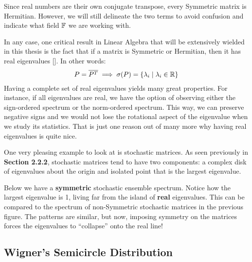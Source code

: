 \begin{remark}
Since real numbers are their own conjugate transpose, every Symmetric matrix is Hermitian. However, we will still delineate the two terms to avoid confusion and indicate what field $\mathbb{F}$ we are working with.
\end{remark}

In any case, one critical result in Linear Algebra that will be extensively wielded in this thesis is the fact that if a matrix is Symmetric or Hermitian, then it has real eigenvalues [\cite{horn}]. In other words:
\begin{align*}
P = \overline{P^{T}} \implies \sigma(P) = \{\lambda_i \mid \lambda_i \in \mathbb{R}\}
\end{align*}
Having a complete set of real eigenvalues yields many great properties. For instance, if all eigenvalues are real, we have the option of observing either the sign-ordered spectrum or the norm-ordered spectrum.
This way, we can preserve negative signs and we would not lose the rotational aspect of the eigenvalue when we study its statistics. That is just one reason out of many more why having real eigenvalues is quite nice.


One very pleasing example to look at is stochastic matrices.
As seen previously in \textbf{Section 2.2.2}, stochastic matrices tend to have two components: a complex disk of eigenvalues about the origin and isolated point that is the largest eigenvalue.

Below we have a \textbf{symmetric} stochastic ensemble spectrum. Notice how the largest eigenvalue is 1, living far from the island of \textbf{real} eigenvalues.
This can be compared to the spectrum of non-Symmetric stochastic matrices in the previous figure.
The patterns are similar, but now, imposing symmetry on the matrices forces the eigenvalues to ``collapse'' onto the real line!


\newpage
\subsection{Wigner's Semicircle Distribution}

